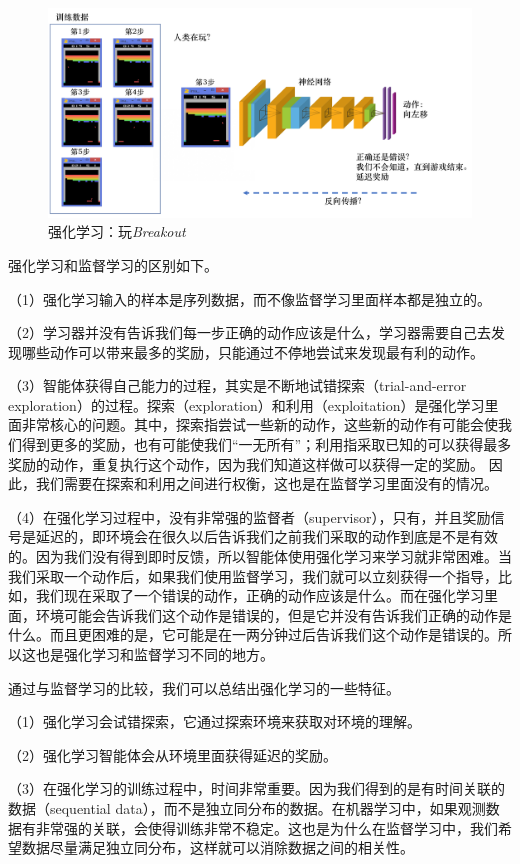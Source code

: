 \begin{figure}[htb]
    \centering
    \includegraphics[width=0.7\linewidth]{res/ch1/1.4}
    \caption{强化学习：玩\textit{Breakout}}
    \label{fig:fig1.4}
\end{figure}

强化学习和监督学习的区别如下。

（1）强化学习输入的样本是序列数据，而不像监督学习里面样本都是独立的。

（2）学习器并没有告诉我们每一步正确的动作应该是什么，学习器需要自己去发现哪些动作可以带来最多的奖励，只能通过不停地尝试来发现最有利的动作。  

（3）智能体获得自己能力的过程，其实是不断地试错探索（trial-and-error exploration）的过程。探索（exploration）和利用（exploitation）是强化学习里面非常核心的问题。其中，探索指尝试一些新的动作，这些新的动作有可能会使我们得到更多的奖励，也有可能使我们“一无所有”；利用指采取已知的可以获得最多奖励的动作，重复执行这个动作，因为我们知道这样做可以获得一定的奖励。
因此，我们需要在探索和利用之间进行权衡，这也是在监督学习里面没有的情况。

（4）在强化学习过程中，没有非常强的监督者（supervisor），只有，并且奖励信号是延迟的，即环境会在很久以后告诉我们之前我们采取的动作到底是不是有效的。因为我们没有得到即时反馈，所以智能体使用强化学习来学习就非常困难。当我们采取一个动作后，如果我们使用监督学习，我们就可以立刻获得一个指导，比如，我们现在采取了一个错误的动作，正确的动作应该是什么。而在强化学习里面，环境可能会告诉我们这个动作是错误的，但是它并没有告诉我们正确的动作是什么。而且更困难的是，它可能是在一两分钟过后告诉我们这个动作是错误的。所以这也是强化学习和监督学习不同的地方。

通过与监督学习的比较，我们可以总结出强化学习的一些特征。

（1）强化学习会试错探索，它通过探索环境来获取对环境的理解。

（2）强化学习智能体会从环境里面获得延迟的奖励。    

（3）在强化学习的训练过程中，时间非常重要。因为我们得到的是有时间关联的数据（sequential data），而不是独立同分布的数据。在机器学习中，如果观测数据有非常强的关联，会使得训练非常不稳定。这也是为什么在监督学习中，我们希望数据尽量满足独立同分布，这样就可以消除数据之间的相关性。

